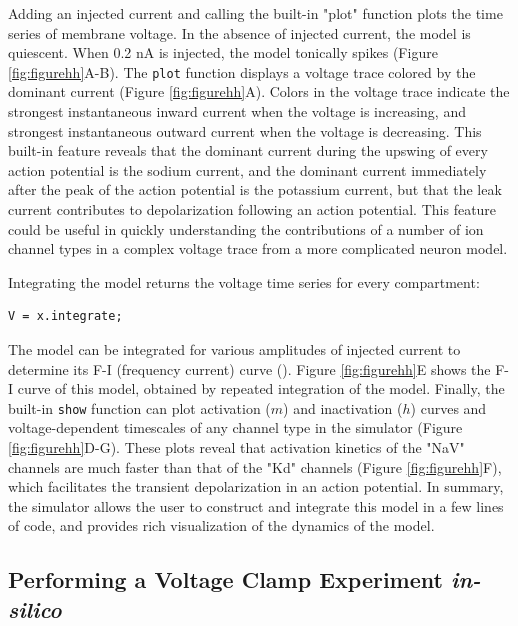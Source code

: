 \documentclass{frontiersSCNS} %
\begin{document}
Adding an injected current and calling the built-in "plot" function plots the time series of membrane voltage. In the absence of injected current, the model is quiescent. When 0.2 nA is injected, the model tonically spikes (Figure \ref{fig:figurehh}A-B).  The \texttt{plot} function displays a voltage trace colored by the dominant current (Figure \ref{fig:figurehh}A). Colors in the voltage trace indicate the strongest instantaneous inward current when the voltage is increasing, and strongest instantaneous outward current when the voltage is decreasing. This built-in feature reveals that the dominant current during the upswing of every action potential is the sodium current, and the dominant current immediately after the peak of the action potential is the potassium current, but that the leak current contributes to depolarization following an action potential. This feature could be useful in quickly understanding the contributions of a number of ion channel types in a complex voltage trace from a more complicated neuron model.

Integrating the model returns the voltage time series for every compartment:

\begin{lstlisting}[style=Matlab-editor]
V = x.integrate;
\end{lstlisting}

The model can be integrated for various amplitudes of injected current to determine its F-I (frequency current) curve (\cite{kisperskyIncreaseSodiumConductance2012}). Figure \ref{fig:figurehh}E shows the F-I curve of this model, obtained by repeated integration of the model.  Finally, the built-in \texttt{show} function can plot activation ($m$) and inactivation ($h$) curves and voltage-dependent timescales of any channel type in the simulator (Figure \ref{fig:figurehh}D-G). These plots reveal that activation kinetics of the "NaV" channels are much faster than that of the "Kd" channels (Figure \ref{fig:figurehh}F), which facilitates the transient depolarization in an action potential. In summary, the simulator allows the user to construct and integrate this model in a few lines of code, and provides rich visualization of the dynamics of the model.


%
%
%
%
%
%




\subsection{Performing a Voltage Clamp Experiment \textit{in-silico}}
\end{document}

